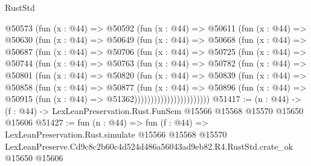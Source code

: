 \begin{lexlean}{RustStd}
\begin{coremodule}
          @50573
            (fun (x : @44) =>
            @50592
              (fun (x : @44) =>
              @50611
                (fun (x : @44) =>
                @50630
                  (fun (x : @44) =>
                  @50649
                    (fun (x : @44) =>
                    @50668
                      (fun (x : @44) =>
                      @50687
                        (fun (x : @44) =>
                        @50706
                          (fun (x : @44) =>
                          @50725
                            (fun (x : @44) =>
                            @50744
                              (fun (x : @44) =>
                              @50763
                                (fun (x : @44) =>
                                @50782
                                  (fun (x : @44) =>
                                  @50801
                                    (fun (x : @44) =>
                                    @50820
                                      (fun (x : @44) =>
                                      @50839
                                        (fun (x : @44) =>
                                        @50858
                                          (fun (x : @44) =>
                                          @50877
                                            (fun (x : @44) =>
                                            @50896
                                              (fun (x : @44) =>
                                              @50915 (fun (x : @44) => @51362)))))))))))))))))))))))
@51417 := (n : @44) ->
  (f : @44) -> LexLeanPreservation.Rust.FunSem @15566 @15568 @15570 @15650 @15606
@51427 := fun (n : @44) =>
  fun (f : @44) =>
  LexLeanPreservation.Rust.simulate
    @15566
    @15568
    @15570
    LexLeanPreserve.Cd9c8c2b60c4d524d486a56043ad9eb82.R4.RustStd.crate_ok
    @15650
    @15606
\end{coremodule}
\end{lexlean}
